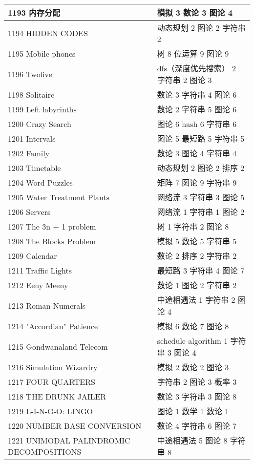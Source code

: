 \begin{longtable}{| p{} | p{} |}
 1193 内存分配  & 模拟 3 数论 3 图论 4 \\ \hline
 1194 HIDDEN CODES  & 动态规划 2 图论 2 字符串 2 \\ \hline
 1195 Mobile phones  & 树 8 位运算 9 图论 9 \\ \hline
 1196 Twofive  & dfs（深度优先搜索） 2 字符串 2 图论 3 \\ \hline
 1198 Solitaire  & 数论 3 字符串 4 图论 6 \\ \hline
 1199 Left labyrinths  & 数论 2 字符串 5 图论 6 \\ \hline
 1200 Crazy Search  & 图论 6 hash 6 字符串 6 \\ \hline
 1201 Intervals  & 图论 5 最短路 5 字符串 5 \\ \hline
 1202 Family  & 数论 3 图论 4 字符串 4 \\ \hline
 1203 Timetable  & 动态规划 2 图论 2 排序 2 \\ \hline
 1204 Word Puzzles  & 矩阵 7 图论 9 字符串 9 \\ \hline
 1205 Water Treatment Plants  & 网络流 3 字符串 3 图论 5 \\ \hline
 1206 Servers  & 网络流 1 字符串 1 图论 2 \\ \hline
 1207 The 3n + 1 problem  & 树 1 字符串 2 图论 8 \\ \hline
 1208 The Blocks Problem  & 模拟 5 数论 5 字符串 5 \\ \hline
 1209 Calendar  & 数论 2 排序 2 字符串 2 \\ \hline
 1211 Traffic Lights  & 最短路 3 字符串 4 图论 7 \\ \hline
 1212 Eeny Meeny  & 数论 1 图论 2 字符串 2 \\ \hline
 1213 Roman Numerals  & 中途相遇法 1 字符串 2 图论 4 \\ \hline
 1214 "Accordian" Patience  & 模拟 6 数论 7 图论 8 \\ \hline
 1215 Gondwanaland Telecom  & schedule algorithm 1 字符串 3 图论 4 \\ \hline
 1216 Simulation Wizardry  & 模拟 2 数论 2 图论 3 \\ \hline
 1217 FOUR QUARTERS  & 字符串 2 图论 3 概率 3 \\ \hline
 1218 THE DRUNK JAILER  & 数论 3 字符串 3 图论 8 \\ \hline
 1219 L-I-N-G-O: LINGO  & 图论 1 数学 1 数论 1 \\ \hline
 1220 NUMBER BASE CONVERSION  & 数论 4 字符串 6 图论 7 \\ \hline
 1221 UNIMODAL PALINDROMIC DECOMPOSITIONS  & 中途相遇法 5 图论 8 字符串 8 \\ \hline

\end{longtable}
